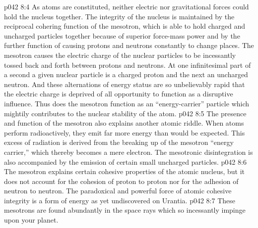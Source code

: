 \vs p042 8:4 As atoms are constituted, neither electric nor gravitational forces could hold the nucleus together. The integrity of the nucleus is maintained by the reciprocal cohering function of the mesotron, which is able to hold charged and uncharged particles together because of superior force\hyp{}mass power and by the further function of causing protons and neutrons constantly to change places. The mesotron causes the electric charge of the nuclear particles to be incessantly tossed back and forth between protons and neutrons. At one infinitesimal part of a second a given nuclear particle is a charged proton and the next an uncharged neutron. And these alternations of energy status are so unbelievably rapid that the electric charge is deprived of all opportunity to function as a disruptive influence. Thus does the mesotron function as an “energy\hyp{}carrier” particle which mightily contributes to the nuclear stability of the atom.
\vs p042 8:5 The presence and function of the mesotron also explains another atomic riddle. When atoms perform radioactively, they emit far more energy than would be expected. This excess of radiation is derived from the breaking up of the mesotron “energy carrier,” which thereby becomes a mere electron. The mesotronic disintegration is also accompanied by the emission of certain small uncharged particles.
\vs p042 8:6 The mesotron explains certain cohesive properties of the atomic nucleus, but it does not account for the cohesion of proton to proton nor for the adhesion of neutron to neutron. The paradoxical and powerful force of atomic cohesive integrity is a form of energy as yet undiscovered on Urantia.
\vs p042 8:7 These mesotrons are found abundantly in the space rays which so incessantly impinge upon your planet.
